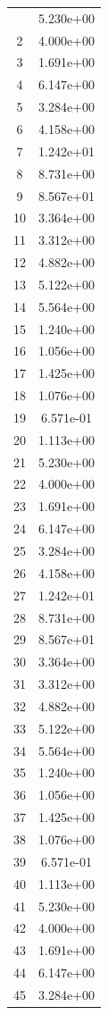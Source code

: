 \documentclass[12pt]{article}
\begin{document}
\begin{longtable}{@{}cc@{}}
\bottomrule
\endlastfoot
1 & 5.230e+00 \\
2 & 4.000e+00 \\
3 & 1.691e+00 \\
4 & 6.147e+00 \\
5 & 3.284e+00 \\
6 & 4.158e+00 \\
7 & 1.242e+01 \\
8 & 8.731e+00 \\
9 & 8.567e+01 \\
10 & 3.364e+00 \\
11 & 3.312e+00 \\
12 & 4.882e+00 \\
13 & 5.122e+00 \\
14 & 5.564e+00 \\
15 & 1.240e+00 \\
16 & 1.056e+00 \\
17 & 1.425e+00 \\
18 & 1.076e+00 \\
19 & 6.571e-01 \\
20 & 1.113e+00 \\
21 & 5.230e+00 \\
22 & 4.000e+00 \\
23 & 1.691e+00 \\
24 & 6.147e+00 \\
25 & 3.284e+00 \\
26 & 4.158e+00 \\
27 & 1.242e+01 \\
28 & 8.731e+00 \\
29 & 8.567e+01 \\
30 & 3.364e+00 \\
31 & 3.312e+00 \\
32 & 4.882e+00 \\
33 & 5.122e+00 \\
34 & 5.564e+00 \\
35 & 1.240e+00 \\
36 & 1.056e+00 \\
37 & 1.425e+00 \\
38 & 1.076e+00 \\
39 & 6.571e-01 \\
40 & 1.113e+00 \\
41 & 5.230e+00 \\
42 & 4.000e+00 \\
43 & 1.691e+00 \\
44 & 6.147e+00 \\
45 & 3.284e+00 \\

\end{longtable}
\end{document}
